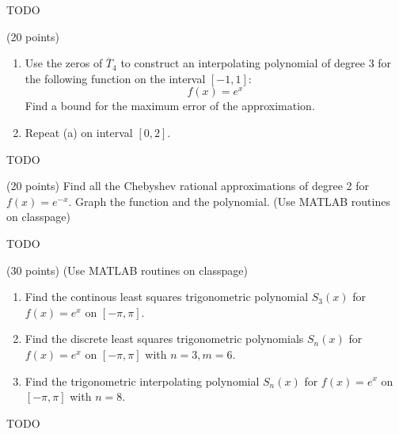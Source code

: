\documentclass[10pt]{jhwhw}
\begin{document}
\solution

	TODO

\problem{} (20 points)

	\begin{enumerate}
		\item Use the zeros of $\overline{T}_4$ to construct an interpolating polynomial of degree
			3 for the following function on the interval $[-1,1]$:
			$$
				f(x) = e^x
			$$
			Find a bound for the maximum error of the approximation.
		\item Repeat (a) on interval $[0, 2]$.
	\end{enumerate}

\solution

	TODO

\problem{} (20 points)
	Find all the Chebyshev rational approximations of degree 2 for $f(x) = e^{-x}$.
	Graph the function and the polynomial. (Use MATLAB routines on classpage)

\solution

	TODO

\problem{} (30 points) (Use MATLAB routines on classpage)

	\begin{enumerate}
		\item Find the continous least squares trigonometric polynomial $S_3(x)$ for
			$f(x) = e^x$ on $[-\pi,\pi]$.
		\item Find the discrete least squares trigonometric polynomials $S_n(x)$ for
			$f(x) = e^x$ on $[-\pi, \pi]$ with $n=3, m=6$.
		\item Find the trigonometric interpolating polynomial $S_n(x)$ for 
			$f(x) = e^x$ on $[-\pi, \pi]$ with $n=8$.
	\end{enumerate}

\solution

	TODO
\end{document}
